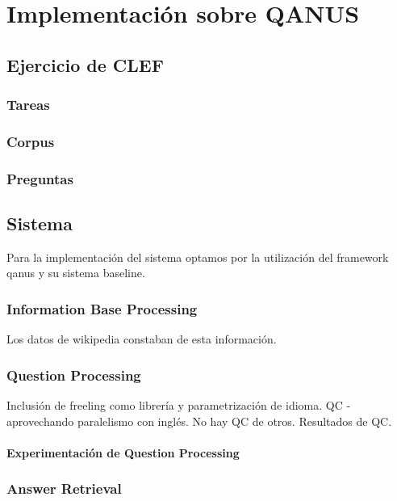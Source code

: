 \chapter{Implementación sobre QANUS}
\section{Ejercicio de CLEF}
\subsection{Tareas}
\subsection{Corpus}
\subsection{Preguntas}

\section{Sistema}
Para la implementación del sistema optamos por la utilización del framework qanus y su sistema baseline.

\subsection{Information Base Processing}
Los datos de wikipedia constaban de esta información.
\subsection{Question Processing}
Inclusión de freeling como librería y parametrización de idioma.
QC -aprovechando paralelismo con inglés. No hay QC de otros.
Resultados de QC.
\subsubsection{Experimentación de Question Processing}
\subsection{Answer Retrieval}
